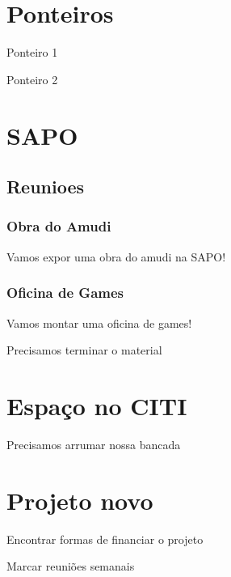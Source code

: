 \documentclass[11pt]{meetingmins}
\begin{document}
\maketitle

\section{Ponteiros}
\begin{hiddenitems}
\item 
Ponteiro 1

\item
Ponteiro 2

\end{hiddenitems}

\section{SAPO}

\subsection{Reunioes}
\subsubsection{Obra do Amudi}

Vamos expor uma obra do amudi na SAPO! 

\subsubsection{Oficina de Games}
\begin{items}
\item 
Vamos montar uma oficina de games!
\item
Precisamos terminar o material

\end{items}

\section{Espaço no CITI}
\begin{items}
\item Precisamos arrumar nossa bancada
\priormins
\end{items}

\section{Projeto novo}
\begin{items}
\item
Encontrar formas de financiar o projeto

\item
Marcar reuniões semanais
\end{items}

\vspace{1em}
\end{document}
